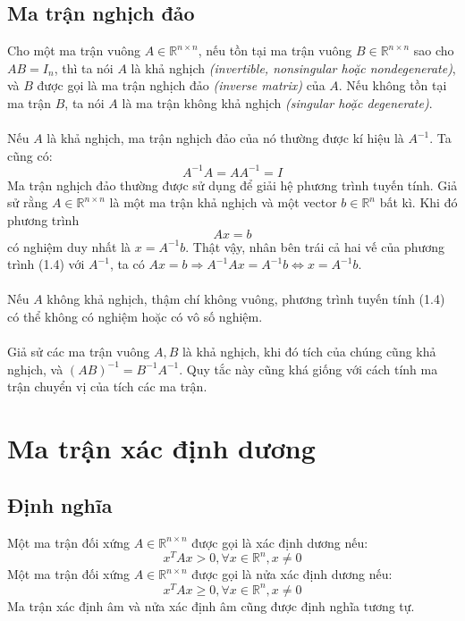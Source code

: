 \documentclass[12pt,a4paper]{report}
\begin{document}
\subsection{Ma trận nghịch đảo}
Cho một ma trận vuông $A \in \mathbb{R}^{n \times n}$, nếu tồn tại ma trận vuông $B \in \mathbb{R}^{n \times n}$ sao cho $AB = I_n$, thì ta nói $A$ là khả nghịch \textit{(invertible, nonsingular hoặc nondegenerate)}, và $B$ được gọi là ma trận nghịch đảo \textit{(inverse matrix)} của $A$. Nếu không tồn tại ma trận $B$, ta nói $A$ là ma trận không khả nghịch \textit{(singular hoặc degenerate)}.\\\\
Nếu $A$ là khả nghịch, ma trận nghịch đảo của nó thường được kí hiệu là $A^{-1}$. Ta cũng có:
\begin{equation}
A^{-1}A = AA^{-1} = I
\end{equation}
Ma trận nghịch đảo thường được sử dụng để giải hệ phương trình tuyến tính. Giả sử rằng $A \in \mathbb{R}^{n \times n}$ là một ma trận khả nghịch và một vector $b \in \mathbb{R}^n$ bất kì. Khi đó phương trình \begin{equation}
Ax = b
\end{equation} có nghiệm duy nhất là $x = A^{-1}b$. Thật vậy, nhân bên trái cả hai vế của phương trình (1.4) với $A^{-1}$, ta có $Ax=b \Rightarrow A^{-1}Ax = A^{-1}b \Leftrightarrow x = A^{-1}b$.
\\\\Nếu $A$ không khả nghịch, thậm chí không vuông, phương trình tuyến tính (1.4) có thể không có nghiệm hoặc có vô số nghiệm.\\\\
Giả sử các ma trận vuông $A, B$ là khả nghịch, khi đó tích của chúng cũng khả nghịch, và $(AB)^{-1} = B^{-1}A^{-1}$. Quy tắc này cũng khá giống với cách tính ma trận chuyển vị của tích các ma trận.

\section{Ma trận xác định dương}
\subsection{Định nghĩa}
Một ma trận đối xứng $A \in \mathbb{R}^{n \times n}$ được gọi là xác định dương nếu: $$x^TAx > 0, \forall x\in \mathbb{R}^n, x \neq 0$$
Một ma trận đối xứng $A \in \mathbb{R}^{n \times n}$ được gọi là nửa xác định dương nếu: $$x^TAx \geq 0, \forall x\in \mathbb{R}^n, x \neq 0$$
Ma trận xác định âm và nửa xác định âm cũng được định nghĩa tương tự.	
\end{document}
